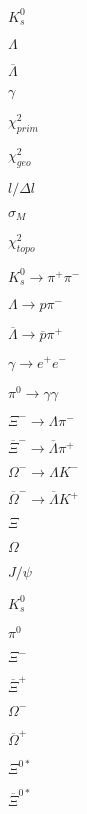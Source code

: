 \documentclass{article}
\begin{document}
$K_s^0$
\pagebreak

$\Lambda$
\pagebreak

$\overline{\Lambda}$
\pagebreak

$\gamma$
\pagebreak

$\chi^2_{prim}$
\pagebreak

$\chi^2_{geo}$
\pagebreak

$l/\Delta l$
\pagebreak

$\sigma_{M}$
\pagebreak

$\chi^2_{topo}$
\pagebreak

$K_s^0\rightarrow\pi^+\pi^-$
\pagebreak

$\Lambda\rightarrow p\pi^-$
\pagebreak

$\overline{\Lambda}\rightarrow \overline{p}\pi^+$
\pagebreak

$\gamma\rightarrow e^+e^-$
\pagebreak

$\pi^0\rightarrow \gamma\gamma$
\pagebreak

$\Xi^-\rightarrow \Lambda\pi^-$
\pagebreak

$\overline{\Xi}^-\rightarrow \overline{\Lambda}\pi^+$
\pagebreak

$\Omega^-\rightarrow \Lambda K^-$
\pagebreak

$\overline{\Omega}^-\rightarrow \overline{\Lambda} K^+$
\pagebreak

$\Xi$
\pagebreak

$\Omega$
\pagebreak

$J/\psi$
\pagebreak

$K^0_s$
\pagebreak

$\pi^0$
\pagebreak

$\Xi^-$
\pagebreak

$\overline{\Xi}^+$
\pagebreak

$\Omega^-$
\pagebreak

$\overline{\Omega}^+$
\pagebreak

$\Xi^{0*}$
\pagebreak

$\overline{\Xi}^{0*}$
\pagebreak
\end{document}
